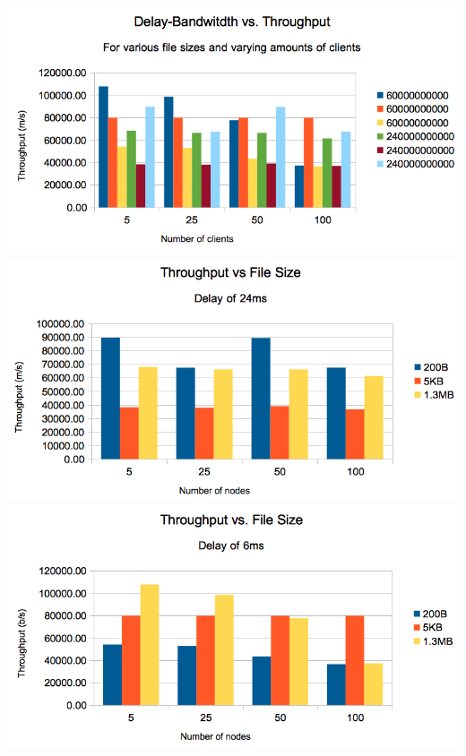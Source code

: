 \documentclass[10pt]{report}
\begin{document}
\includegraphics[scale=0.6]{images/through_delay.png}\\
\includegraphics[scale=0.6]{images/through_size24ms.png}\\
\includegraphics[scale=0.6]{images/through_size6ms.png}\\

%
\end{document}
